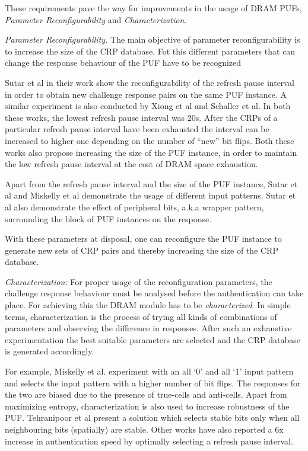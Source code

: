 \documentclass[journal, a4paper]{IEEEtran}
\begin{document}
These requirements pave the way for improvements in the usage of DRAM PUFs, \textit{Parameter Reconfigurability} and \textit{Characterization}.

\textit{Parameter Reconfigurability.} The main objective of parameter reconfigurability is to increase the size of the CRP database. Fot this different parameters that can change the response behaviour of the PUF have to be recognized

Sutar et al in their work show the reconfigurability of the refresh pause interval in order to obtain new challenge response pairs on the same PUF instance. A similar experiment is also conducted by Xiong et al and Schaller et al. In both these works, the lowest refresh pause interval was 20s. After the CRPs of a particular refresh pause interval have been exhausted the interval can be increased to higher one depending on the number of “new” bit flips. Both these works also propose increasing the size of the PUF instance, in order to maintain the low refresh pause interval at the cost of DRAM space exhaustion. 

Apart from the refresh pause interval and the size of the PUF instance, Sutar et al and Miskelly et al demonstrate the usage of different input patterns. Sutar et al also demonstrate the effect of peripheral bits, a.k.a wrapper pattern, surrounding the block of PUF instances on the response.

With these parameters at disposal, one can reconfigure the PUF instance to generate new sets of CRP pairs and thereby increasing the size of the CRP database.

\textit{Characterization:} For proper usage of the reconfiguration parameters, the challenge response behaviour must be analysed before the authentication can take place. For achieving this the DRAM module has to be \textit{characterized}. In simple terms, characterization is the process of trying all kinds of combinations of parameters and observing the difference in responses.\cite{SUT18} After such an exhaustive experimentation the best suitable parameters are selected and the CRP database is generated accordingly. 

For example, Miskelly et al. experiment with an all ‘0’ and all ‘1’ input pattern and selects the input pattern with a higher number of bit flips. The responses for the two are biased due to the presence of true-cells and anti-cells. Apart from maximizing entropy, characterization is also used to increase robustness of the PUF. Tehranipoor et al present a solution which selects stable bits only when all neighbouring bits (spatially) are stable. Other works have also reported a 6x increase in authentication speed by optimally selecting a refresh pause interval. \cite{SUT18} \cite{SCH19}
\end{document}
